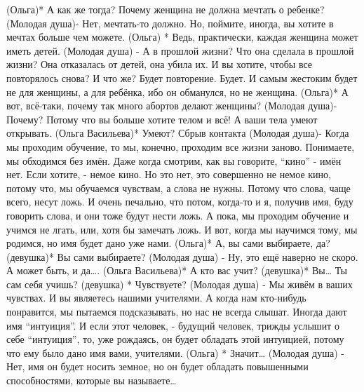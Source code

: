 (Ольга)* А как же тогда? Почему женщина не должна мечтать о ребенке?
(Молодая душа)- Нет, мечтать-то должно. Но, поймите, иногда, вы хотите в мечтах больше чем можете.
(Ольга) * Ведь, практически, каждая женщина может иметь детей.
(Молодая душа) - А в прошлой жизни? Что она сделала в прошлой жизни? Она отказалась от детей, она убила их. И вы хотите, чтобы все повторялось снова? И что же? Будет повторение. Будет. И самым жестоким будет не для женщины, а для ребёнка, ибо он обманулся, но не женщина.
(Ольга)* А вот, всё-таки, почему так много абортов делают женщины?
(Молодая душа)- Почему? Потому что вы больше хотите телом и всё! А ваши тела умеют открывать. 
(Ольга Васильева)* Умеют?
Сбрыв контакта
(Молодая душа)-  Когда мы проходим обучение, то мы, конечно, проходим все жизни заново. Понимаете, мы обходимся без имён. Даже когда смотрим, как вы говорите, ``кино''  - имён нет. Если хотите, - немое кино. Но это нет, это совершенно не немое кино,  потому что, мы обучаемся чувствам, а слова не нужны. Потому что слова, чаще всего, несут ложь. И очень печально, что потом, когда-то и я, получив имя, буду говорить слова, и они тоже будут нести ложь. А пока, мы проходим обучение и учимся не лгать, или, хотя бы замечать ложь. И вот, когда мы научимся тому, мы родимся, но имя будет дано уже нами. 
(Ольга)*  А, вы сами выбираете, да?
(девушка)* Вы сами выбираете?
(Молодая душа) - Ну, это ещё наверно не скоро. А может быть, и да….
(Ольга Васильева)* А кто вас учит?
(девушка)* Вы… Ты сам себя учишь?
(девушка) * Чувствуете?
(Молодая душа) - Мы живём в ваших чувствах. И вы являетесь нашими учителями. А когда нам кто-нибудь понравится, мы пытаемся подсказывать, но нас не всегда слышат. Иногда дают имя ``интуиция''. И если этот человек, - будущий человек,  трижды услышит о себе ``интуиция'', то, уже рождаясь, он будет обладать этой интуицией, потому что ему было дано имя вами, учителями.
(Ольга) * Значит…
(Молодая душа) - Нет, имя он будет носить земное, но он будет обладать повышенными способностями, которые вы называете… 
